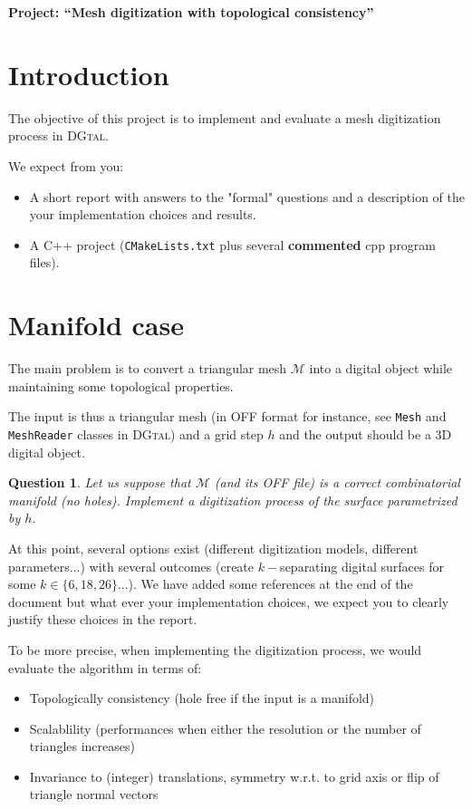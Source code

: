 \documentclass[a4paper, 11pt]{article}
\title{}
\author{}
\date{}
\newtheorem{qu}{Question}
\begin{document}
\begin{center}
	\LARGE \textbf{Project: ``Mesh digitization with topological consistency''}
\end{center}

\section*{Introduction} 

The objective of this project is to implement and evaluate a mesh
digitization process in \textsc{DGtal}.

We expect from you:
\begin{itemize}
\item A short report with answers to the "formal" questions and a
  description of the your implementation choices and results.
\item A C++ project (\texttt{CMakeLists.txt} plus several
  \textbf{commented} cpp program files).
\end{itemize}


\section{Manifold case}

The main problem is to convert a triangular mesh $\mathcal{M}$ into a
digital object while maintaining some topological properties.

The input is thus a triangular mesh (in OFF format for instance, see
\texttt{Mesh} and \texttt{MeshReader} classes in \textsc{DGtal}) and a
grid step $h$ and the output should be a 3D digital object.


\begin{qu}
  Let us suppose that $\mathcal{M}$ (and its OFF file) is a correct
  combinatorial manifold (no holes). Implement a digitization process
  of the surface parametrized by $h$.
\end{qu}


At this point, several options exist (different digitization models,
different parameters...) with several outcomes (create $k-$separating
digital surfaces for some $k\in\{6,18,26\}$...). We have added some
references at the end of the document but what ever your
implementation choices, we expect you to clearly justify these choices
in the report.

To be more precise, when implementing the digitization process, we
would evaluate the algorithm in terms of:
\begin{itemize}
\item Topologically consistency (hole free if the input is a manifold)
\item Scalablility (performances when either the resolution or the
  number of triangles increases)
\item Invariance to (integer) translations, symmetry w.r.t. to grid
  axis or flip of triangle normal vectors
\end{itemize}
\end{document}
